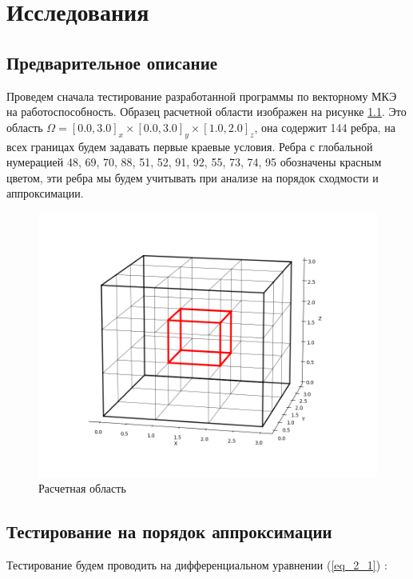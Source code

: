 \chapter{Исследования}

\section{Предварительное описание}

Проведем сначала тестирование разработанной программы по векторному МКЭ на работоспособность. Образец расчетной области изображен на рисунке \ref{fig:exampleOfArea}. Это область $\Omega = [0.0, 3.0]_x \times [0.0, 3.0]_y \times [1.0, 2.0]_z$, она содержит 144 ребра, на всех границах будем задавать первые краевые условия. Ребра с глобальной нумерацией 48, 69, 70, 88, 51, 52, 91, 92, 55, 73, 74, 95 обозначены красным цветом, эти ребра мы будем учитывать при анализе на порядок сходмости и аппроксимации. 

\begin{figure}
	\centering
	\includegraphics[width=1.0\linewidth]{images/3D_grid_example.png}
	\caption{Расчетная область}
	\label{fig:exampleOfArea}
\end{figure}

\section{Тестирование на порядок аппроксимации}

Тестирование будем проводить на дифференциальном уравнении (\ref{eq_2_1}) :

